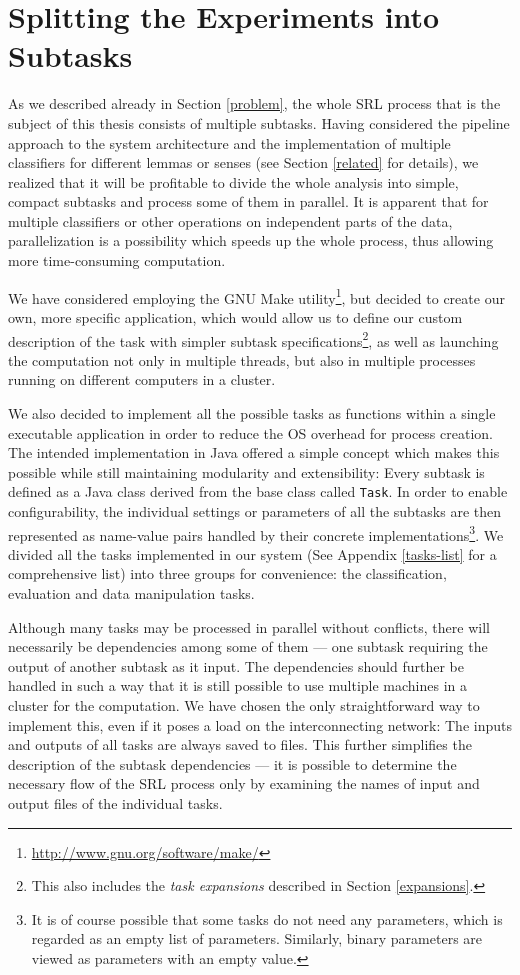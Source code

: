 \documentclass[12pt,notitlepage,a4paper]{report}
\begin{document}
\section{Splitting the Experiments into Subtasks}\label{tasks}

As we described already in Section \ref{problem}, the whole SRL process that is the subject of this thesis consists of multiple subtasks. Having considered the pipeline approach to the system architecture and the implementation of multiple classifiers for different lemmas or senses (see Section \ref{related} for details), we realized that it will be profitable to divide the whole analysis into simple, compact subtasks and process some of them in parallel. It is apparent that for multiple classifiers or other operations on independent parts of the data, parallelization is a possibility which speeds up the whole process, thus allowing more time-consuming computation.

We have considered employing the GNU Make utility\footnote{\url{http://www.gnu.org/software/make/}}, but decided to create our own, more specific application, which would allow us to define our custom description of the task with simpler subtask specifications\footnote{This also includes the \emph{task expansions} described in Section \ref{expansions}.}, as well as launching the computation not only in multiple threads, but also in multiple processes running on different computers in a cluster.

We also decided to implement all the possible tasks as functions within a single executable application in order to reduce the OS overhead for process creation. The intended implementation in Java offered a simple concept which makes this possible while still maintaining modularity and extensibility: Every subtask is defined as a Java class derived from the base class called \texttt{Task}. In order to enable configurability, the individual settings or parameters of all the subtasks are then represented as name-value pairs handled by their concrete implementations\footnote{It is of course possible that some tasks do not need any parameters, which is regarded as an empty list of parameters. Similarly, binary parameters are viewed as parameters with an empty value.}. We divided all the tasks implemented in our system (See Appendix \ref{tasks-list} for a comprehensive list) into three groups for convenience: the classification, evaluation and data manipulation tasks.

Although many tasks may be processed in parallel without conflicts, there will necessarily be dependencies among some of them --- one subtask requiring the output of another subtask as it input. The dependencies should further be handled in such a way that it is still possible to use multiple machines in a cluster for the computation. We have chosen the only straightforward way to implement this, even if it poses a load on the interconnecting network: The inputs and outputs of all tasks are always saved to files. This further simplifies the description of the subtask dependencies --- it is possible to determine the necessary flow of the SRL process only by examining the names of input and output files of the individual tasks.
\end{document}
